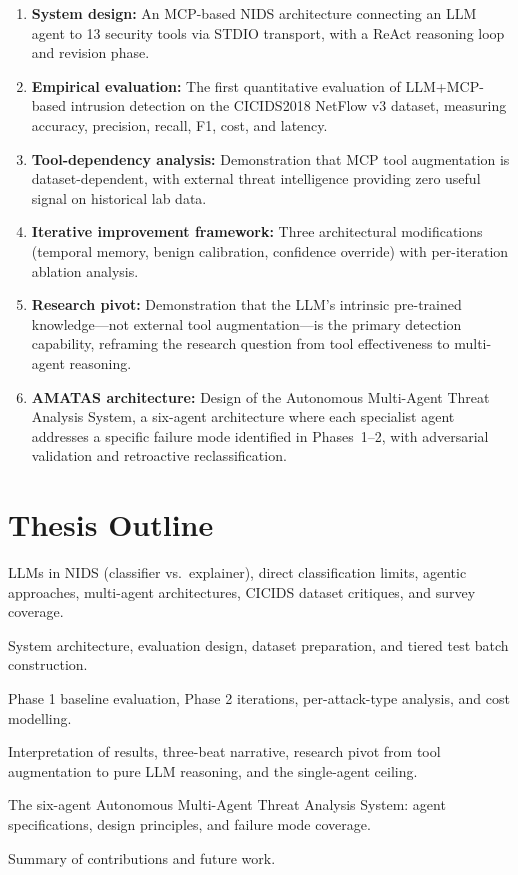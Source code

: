 \documentclass[12pt, a4paper, oneside]{report}
\begin{document}
\begin{enumerate}
  \item \textbf{System design:} An MCP-based NIDS architecture connecting an
        LLM agent to 13 security tools via STDIO transport, with a ReAct
        reasoning loop and revision phase.
  \item \textbf{Empirical evaluation:} The first quantitative evaluation of
        LLM+MCP-based intrusion detection on the CICIDS2018 NetFlow v3 dataset,
        measuring accuracy, precision, recall, F1, cost, and latency.
  \item \textbf{Tool-dependency analysis:} Demonstration that MCP tool
        augmentation is dataset-dependent, with external threat intelligence
        providing zero useful signal on historical lab data.
  \item \textbf{Iterative improvement framework:} Three architectural
        modifications (temporal memory, benign calibration, confidence override)
        with per-iteration ablation analysis.
  \item \textbf{Research pivot:} Demonstration that the LLM's intrinsic
        pre-trained knowledge---not external tool augmentation---is the
        primary detection capability, reframing the research question from
        tool effectiveness to multi-agent reasoning.
  \item \textbf{AMATAS architecture:} Design of the Autonomous Multi-Agent
        Threat Analysis System, a six-agent architecture where each specialist
        agent addresses a specific failure mode identified in Phases~1--2,
        with adversarial validation and retroactive reclassification.
\end{enumerate}

\section{Thesis Outline}
\label{sec:outline}

\begin{description}[style=nextline, leftmargin=2em]
  \item[Chapter 2: Literature Review] LLMs in NIDS (classifier vs.\ explainer),
    direct classification limits, agentic approaches, multi-agent architectures,
    CICIDS dataset critiques, and survey coverage.
  \item[Chapter 3: Methodology] System architecture, evaluation design, dataset
    preparation, and tiered test batch construction.
  \item[Chapter 4: Results] Phase 1 baseline evaluation, Phase 2 iterations,
    per-attack-type analysis, and cost modelling.
  \item[Chapter 5: Discussion] Interpretation of results, three-beat narrative,
    research pivot from tool augmentation to pure LLM reasoning, and
    the single-agent ceiling.
  \item[Chapter 6: Phase 3 --- Proposed AMATAS Architecture] The six-agent
    Autonomous Multi-Agent Threat Analysis System: agent specifications,
    design principles, and failure mode coverage.
  \item[Chapter 7: Conclusion] Summary of contributions and future work.
\end{description}
\end{document}
